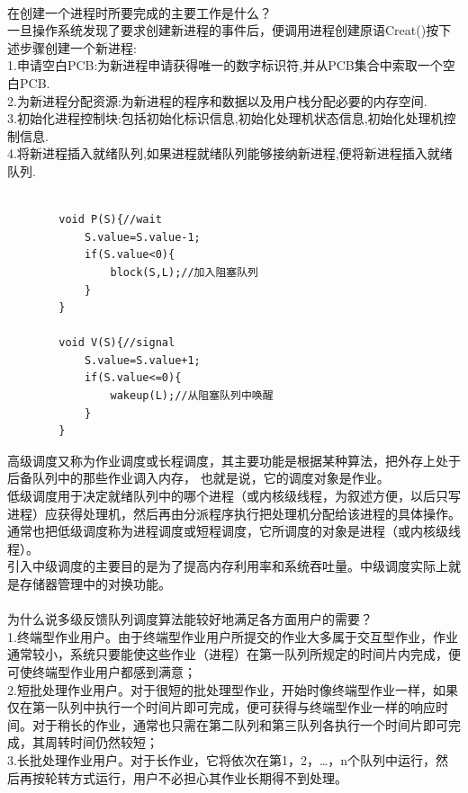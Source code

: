 \documentclass[UTF8]{article}
\begin{document}
    \\
    在创建一个进程时所要完成的主要工作是什么？\\
    一旦操作系统发现了要求创建新进程的事件后，便调用进程创建原语Creat()按下述步骤创建一个新进程:\\
    1.申请空白PCB:为新进程申请获得唯一的数字标识符,并从PCB集合中索取一个空白PCB.\\
    2.为新进程分配资源:为新进程的程序和数据以及用户栈分配必要的内存空间.\\
    3.初始化进程控制块:包括初始化标识信息,初始化处理机状态信息,初始化处理机控制信息.\\
    4.将新进程插入就绪队列,如果进程就绪队列能够接纳新进程,便将新进程插入就绪队列.\\
    \\
    \lstset{language=C}
    \begin{lstlisting}
        void P(S){//wait
            S.value=S.value-1;
            if(S.value<0){
                block(S,L);//加入阻塞队列
            }
        }

        void V(S){//signal
            S.value=S.value+1;
            if(S.value<=0){
                wakeup(L);//从阻塞队列中唤醒
            }
        }
    \end{lstlisting}
    高级调度又称为作业调度或长程调度，其主要功能是根据某种算法，把外存上处于后备队列中的那些作业调入内存，
    也就是说，它的调度对象是作业。\\
    低级调度用于决定就绪队列中的哪个进程（或内核级线程，为叙述方便，以后只写进程）应获得处理机，然后再由分派程序执行把处理机分配给该进程的具体操作。通常也把低级调度称为进程调度或短程调度，它所调度的对象是进程（或内核级线程）。 \\
    引入中级调度的主要目的是为了提高内存利用率和系统吞吐量。中级调度实际上就是存储器管理中的对换功能。\\
    \\
    为什么说多级反馈队列调度算法能较好地满足各方面用户的需要？\\
    1.终端型作业用户。由于终端型作业用户所提交的作业大多属于交互型作业，作业通常较小，系统只要能使这些作业（进程）在第一队列所规定的时间片内完成，便可使终端型作业用户都感到满意；\\
    2.短批处理作业用户。对于很短的批处理型作业，开始时像终端型作业一样，如果仅在第一队列中执行一个时间片即可完成，便可获得与终端型作业一样的响应时间。对于稍长的作业，通常也只需在第二队列和第三队列各执行一个时间片即可完成，其周转时间仍然较短；\\
    3.长批处理作业用户。对于长作业，它将依次在第1，2，…，n个队列中运行，然后再按轮转方式运行，用户不必担心其作业长期得不到处理。\\
\end{document}

